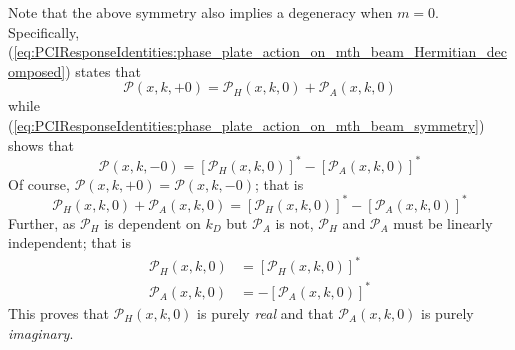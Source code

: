 Note that the above symmetry also implies a degeneracy when $m = 0$.
Specifically,
(\ref{eq:PCIResponseIdentities:phase_plate_action_on_mth_beam_Hermitian_decomposed})
states that
\begin{equation}
  \mathcal{P}(x, k, +0)
  =
  \mathcal{P}_H(x, k, 0)
  +
  \mathcal{P}_A(x, k, 0)
  \label{eq:PCIResponseIdentities:phase_plate_action_on_plus0_beam}
\end{equation}
while (\ref{eq:PCIResponseIdentities:phase_plate_action_on_mth_beam_symmetry})
shows that
\begin{equation}
  \mathcal{P}(x, k, -0)
  =
  [\mathcal{P}_H(x, k, 0)]^*
  -
  [\mathcal{P}_A(x, k, 0)]^*
  \label{eq:PCIResponseIdentities:phase_plate_action_on_minus0_beam}
\end{equation}
Of course, $\mathcal{P}(x, k, +0) = \mathcal{P}(x, k, -0)$; that is
\begin{equation}
  \mathcal{P}_H(x, k, 0)
  +
  \mathcal{P}_A(x, k, 0)
  =
  [\mathcal{P}_H(x, k, 0)]^*
  -
  [\mathcal{P}_A(x, k, 0)]^*
\end{equation}
Further, as $\mathcal{P}_H$ is dependent on $k_D$ but $\mathcal{P}_A$ is not,
$\mathcal{P}_H$ and $\mathcal{P}_A$ must be linearly independent;
that is
\begin{align}
  \mathcal{P}_H(x, k, 0) &= [\mathcal{P}_H(x, k, 0)]^*
  \\
  \mathcal{P}_A(x, k, 0) &= -[\mathcal{P}_A(x, k, 0)]^*
\end{align}
This proves that $\mathcal{P}_H(x, k, 0)$ is purely \emph{real} and
that $\mathcal{P}_A(x, k, 0)$ is purely \emph{imaginary}.
